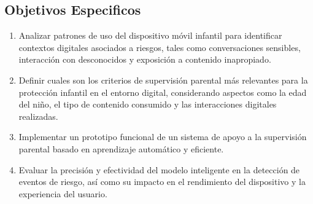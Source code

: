 \subsection{Objetivos Especificos}
\begin{enumerate}
    \item Analizar patrones de uso del dispositivo móvil infantil para identificar contextos digitales asociados a riesgos, tales como conversaciones sensibles, interacción con desconocidos y exposición a contenido inapropiado.
    \item Definir cuales son los criterios de supervisión parental más relevantes para la protección infantil en el entorno digital, considerando aspectos como la edad del niño, el tipo de contenido consumido y las interacciones digitales realizadas.
    \item Implementar un prototipo funcional de un sistema de apoyo a la supervisión parental basado en aprendizaje automático y eficiente.
    \item Evaluar la precisión y efectividad del modelo inteligente en la detección de eventos de riesgo, así como su impacto en el rendimiento del dispositivo y la experiencia del usuario.
\end{enumerate}